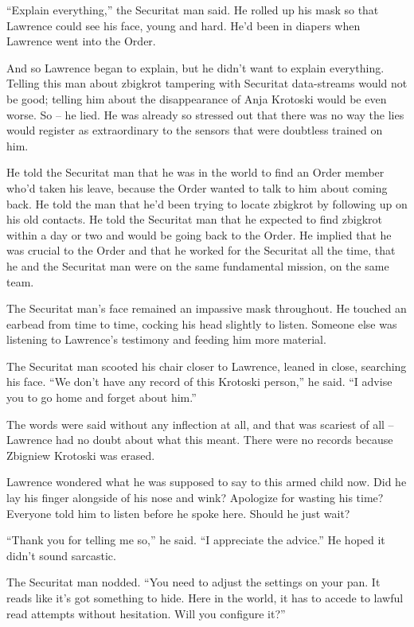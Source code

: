 “Explain everything,” the Securitat man said. He rolled up his mask 
so that Lawrence could see his face, young and hard. He'd been in 
diapers when Lawrence went into the Order.

And so Lawrence began to explain, but he didn't want to explain 
everything. Telling this man about zbigkrot tampering with Securitat 
data-streams would not be good; telling him about the disappearance of 
Anja Krotoski would be even worse. So -- he lied. He was already so 
stressed out that there was no way the lies would register as 
extraordinary to the sensors that were doubtless trained on him.

He told the Securitat man that he was in the world to find an Order 
member who'd taken his leave, because the Order wanted to talk to him 
about coming back. He told the man that he'd been trying to locate 
zbigkrot by following up on his old contacts. He told the Securitat man 
that he expected to find zbigkrot within a day or two and would be 
going back to the Order. He implied that he was crucial to the Order 
and that he worked for the Securitat all the time, that he and the 
Securitat man were on the same fundamental mission, on the same team.

The Securitat man's face remained an impassive mask throughout. He 
touched an earbead from time to time, cocking his head slightly to 
listen. Someone else was listening to Lawrence's testimony and feeding 
him more material.

The Securitat man scooted his chair closer to Lawrence, leaned in 
close, searching his face. “We don't have any record of this Krotoski 
person,” he said. “I advise you to go home and forget about him.”

The words were said without any inflection at all, and that was 
scariest of all -- Lawrence had no doubt about what this meant. There 
were no records because Zbigniew Krotoski was erased.

Lawrence wondered what he was supposed to say to this armed child now. 
Did he lay his finger alongside of his nose and wink? Apologize for 
wasting his time? Everyone told him to listen before he spoke here. 
Should he just wait?

“Thank you for telling me so,” he said. “I appreciate the 
advice.” He hoped it didn't sound sarcastic.

The Securitat man nodded. “You need to adjust the settings on your 
pan. It reads like it's got something to hide. Here in the world, it 
has to accede to lawful read attempts without hesitation. Will you 
configure it?”

